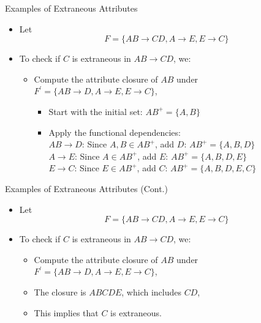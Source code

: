 \documentclass{beamer}
\begin{document}
\begin{frame}{Examples of Extraneous Attributes}
    \begin{itemize}
        \item Let
            $$
                F = \{ AB \rightarrow CD, A \rightarrow E, E \rightarrow C \}
            $$
        \item To check if $C$ is extraneous in $AB \rightarrow CD$, we:
            \begin{itemize}
                \item Compute the attribute closure of $AB$ under $F^\prime = \{ AB \rightarrow D, A \rightarrow E, E \rightarrow C \}$,
                    \begin{itemize}
                        \item Start with the initial set: $AB^+ = \{ A, B \}$
                        \item Apply the functional dependencies: \\
                            \( AB \rightarrow D \): Since \( A, B \in AB^+ \), add \( D \): $AB^+ = \{ A, B, D \}$ \\
                            \( A \rightarrow E \): Since \( A \in AB^+ \), add \( E \): $AB^+ = \{ A, B, D, E \}$ \\
                            \( E \rightarrow C \): Since \( E \in AB^+ \), add \( C \): $AB^+ = \{ A, B, D, E, C \}$
                    \end{itemize}
            \end{itemize}
    \end{itemize}
\end{frame}

\begin{frame}{Examples of Extraneous Attributes (Cont.)}
    \begin{itemize}
        \item Let
            $$
                F = \{ AB \rightarrow CD, A \rightarrow E, E \rightarrow C \}
            $$
        \item To check if $C$ is extraneous in $AB \rightarrow CD$, we:
            \begin{itemize}
                \item Compute the attribute closure of $AB$ under $F^\prime = \{ AB \rightarrow D, A \rightarrow E, E \rightarrow C \}$,
                \item The closure is $ABCDE$, which includes $CD$,
                \item This implies that $C$ is extraneous.
            \end{itemize}
    \end{itemize}
\end{frame}
\end{document}
